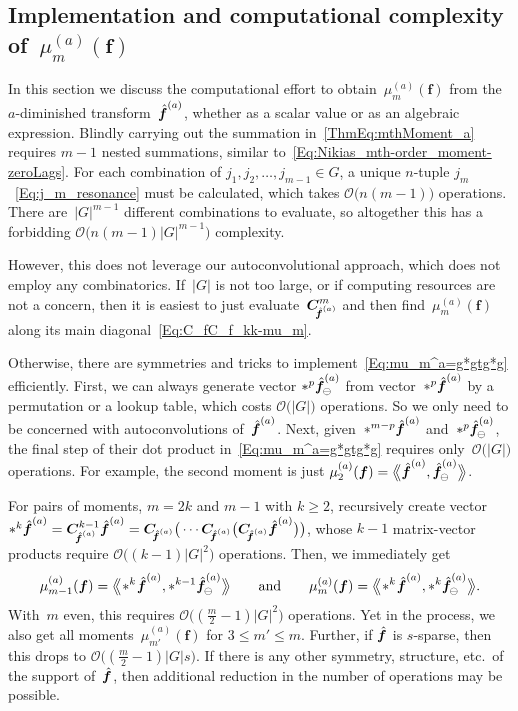 \documentclass[letterpaper,11pt]{article}
\newcommand{\bs}[1]{{\boldsymbol{#1}}}
\newcommand{\gr}[1]{( #1 )}
\newcommand{\Gr}[1]{\big( #1 \big)}
\newcommand{\abs}[1]{\vert #1 \vert}
\newcommand{\conv}{\ast}
\newcommand{\dimin}[2]{{ #1 }^{\gr{#2}}}
\newcommand{\Dotprod}[2]{\big\langle\!\:\!\!\big\langle #1, #2 \big\rangle\!\:\!\!\big\rangle}
\newcommand{\hatbsf}{{\kern+0.25em}\hat{{\kern-0.25em}\bs{f}}}
\theoremstyle{definition} \newtheorem{remark}{Remark}
\begin{document}
\subsection{Implementation and computational complexity of~$\dimin{\mu}{a}_m\gr{\bs{f}}$} \label{Sec:ComputationalComplexity}
In this section we discuss the computational effort to obtain~$\dimin{\mu}{a}_m\gr{\bs{f}}$ from the $a$-diminished transform~$\dimin{\hatbsf}{a}$, whether as a scalar value or as an algebraic expression. Blindly carrying out the summation in~\eqref{ThmEq:mthMoment_a} requires $m-1$ nested summations, similar to~\eqref{Eq:Nikias_mth-order_moment-zeroLags}.
For each combination of $j_1,j_2,\ldots,j_{m-1} \in G$, a unique $n$-tuple $j_m$~\eqref{Eq:j_m_resonance} must be calculated, which takes $\mathcal{O}\Gr{n\gr{m-1}}$ operations. There are~$\abs{G}^{m-1}$ different combinations to evaluate, so altogether this has a forbidding $\mathcal{O}\Gr{n\gr{m-1}\abs{G}^{m-1}}$ complexity.

However, this does not leverage our autoconvolutional approach, which does not employ any combinatorics. If~$\abs{G}$ is not too large, or if computing resources are not a concern, then it is easiest to just evaluate~$\bs{C}_{\!\!\dimin{\hatbsf}{a}}^m$ and then find~$\dimin{\mu}{a}_m\gr{\bs{f}}$ along its main diagonal~\eqref{Eq:C_fC_f_kk-mu_m}.

Otherwise, there are symmetries and tricks to implement~\eqref{Eq:mu_m^a=g*gtg*g} efficiently. First, we can always generate vector $\conv^p \dimin{\hatbsf}{a}_{\!\ominus}$ from vector~$\conv^{p} \dimin{\hatbsf}{a}$ by a permutation or a lookup table, which costs $\mathcal{O}\Gr{\abs{G}}$ operations. So we only need to be concerned with autoconvolutions of~$\dimin{\hatbsf}{a}$. Next, given~$\conv^{m-p} \dimin{\hatbsf}{a}$ and~$\conv^p \dimin{\hatbsf}{a}_{\!\ominus}$, the final step of their dot product in~\eqref{Eq:mu_m^a=g*gtg*g} requires only~$\mathcal{O}\Gr{\abs{G}}$ operations. For example, the second moment is just $\dimin{\mu}{a}_2\gr{\bs{f}} = \Dotprod{\dimin{\hatbsf}{a}}
{\dimin{\hatbsf}{a}_{\!\ominus}}$.

For pairs of moments, $m=2k$ and $m-1$ with $k\geq2$, recursively create vector $\conv^k \dimin{\hatbsf}{a} = \bs{C}_{\!\!\dimin{\hatbsf}{a}}^{k-1} \dimin{\hatbsf}{a} = \bs{C}_{\!\!\dimin{\hatbsf}{a}} \Gr{\cdots \bs{C}_{\!\!\dimin{\hatbsf}{a}} \Gr{\bs{C}_{\!\!\dimin{\hatbsf}{a}} \dimin{\hatbsf}{a}}}$, whose ${k-1}$ matrix-vector products require $\mathcal{O}\Gr{\gr{k-1}\abs{G}^2}$ operations. Then, we immediately get
$$
\dimin{\mu}{a}_{m-1}\gr{\bs{f}} = \Dotprod{\!\conv^{k} \!\dimin{\hatbsf}{a}}{\conv^{k-1} \dimin{\hatbsf}{a}_{\!\ominus}}
\qquad\text{and}\qquad
\dimin{\mu}{a}_m\gr{\bs{f}} = \Dotprod{\!\conv^{k} \!\dimin{\hatbsf}{a}}{\conv^k \dimin{\hatbsf}{a}_{\!\ominus}}.
$$
With~$m$ even, this requires $\mathcal{O}\Gr{\gr{\frac{m}{2}-1}\abs{G}^2}$ operations. Yet in the process, we also get all moments~$\dimin{\mu}{a}_{m'}\gr{\bs{f}}$ for $3\leq m'\leq m$. Further, if $\hatbsf$ is $s$-sparse, then this drops to $\mathcal{O}\Gr{\gr{\frac{m}{2}-1}\abs{G}s}$. If there is any other symmetry, structure, etc.~of the support of~$\hatbsf$, then additional reduction in the number of operations may be possible.
\end{document}
